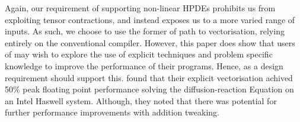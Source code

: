 Again, our requirement of supporting non-linear HPDEs prohibits us from exploiting tensor contractions, and instead exposes us to a more varied range of inputs.
As such, we choose to use the former of  \citeauthor{codegen_dg_SIMD} path to vectorisation, relying entirely on the conventional compiler.
However, this paper does show that users of \phlat may wish to explore the use of explicit techniques and problem specific knowledge to improve the performance of their programs.
Hence, as a design requirement \phlat should support this.
\citeauthor{codegen_dg_SIMD} found that their explicit vectorisation achived 50\% peak floating point performance solving the diffusion-reaction Equation on an Intel Haswell system.
Although, they noted that there was potential for further performance improvements with addition tweaking.  
